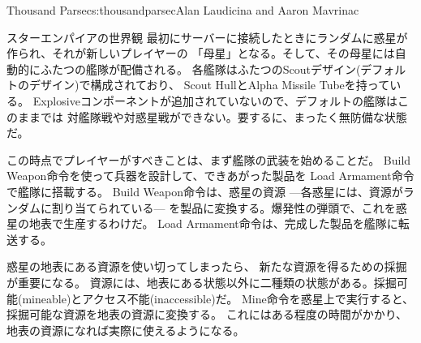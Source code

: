 \begin{aosachapter}{Thousand Parsec}{s:thousandparsec}{Alan Laudicina and Aaron Mavrinac}
\begin{aosasect1}{スターエンパイアの世界観}
最初にサーバーに接続したときにランダムに惑星が作られ、それが新しいプレイヤーの
「母星」となる。そして、その母星には自動的にふたつの艦隊が配備される。
各艦隊はふたつのScoutデザイン(デフォルトのデザイン)で構成されており、
Scout HullとAlpha Missile Tubeを持っている。
Explosiveコンポーネントが追加されていないので、デフォルトの艦隊はこのままでは
対艦隊戦や対惑星戦ができない。要するに、まったく無防備な状態だ。

\pagebreak

この時点でプレイヤーがすべきことは、まず艦隊の武装を始めることだ。
Build Weapon命令を使って兵器を設計して、できあがった製品を
Load Armament命令で艦隊に搭載する。
Build Weapon命令は、惑星の資源
---各惑星には、資源がランダムに割り当てられている---
を製品に変換する。爆発性の弾頭で、これを惑星の地表で生産するわけだ。
Load Armament命令は、完成した製品を艦隊に転送する。

惑星の地表にある資源を使い切ってしまったら、
新たな資源を得るための採掘が重要になる。
資源には、地表にある状態以外に二種類の状態がある。採掘可能(mineable)とアクセス不能(inaccessible)だ。
Mine命令を惑星上で実行すると、採掘可能な資源を地表の資源に変換する。
これにはある程度の時間がかかり、地表の資源になれば実際に使えるようになる。


\end{aosasect1}
\end{aosachapter}
